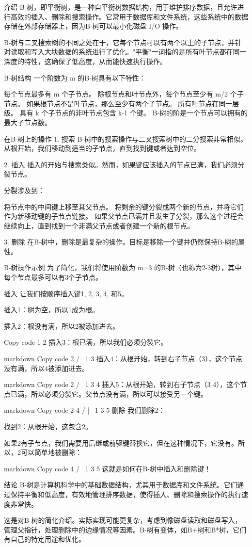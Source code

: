
\begin{issues}
\issueDraft
\end{issues}

介绍
B-树，即平衡树，是一种自平衡树数据结构，用于维护排序数据，且允许进行高效的插入、删除和搜索操作。它常用于数据库和文件系统，这些系统中的数据存储在外部存储器上，因为B-树可以最小化磁盘 I/O 操作。

B-树与二叉搜索树的不同之处在于，它每个节点可以有两个以上的子节点，并针对读取和写入大块数据的系统进行了优化。"平衡"一词指的是所有叶节点都在同一深度的特性，这确保了低高度，从而能快速执行操作。

B-树结构
一个阶数为 m 的B-树具有以下特性：

每个节点最多有 m 个子节点。
除根节点和叶节点外，每个节点至少有 m/2 个子节点。
如果根节点不是叶节点，那么至少有两个子节点。
所有叶节点在同一层级。
具有 k 个子节点的非叶节点包含 k-1 个键。
B-树的阶是一个节点可以拥有的最大子节点数。

在B-树上的操作
1. 搜索
B-树中的搜索操作与二叉搜索树中的二分搜索非常相似。从根开始，我们移动到适当的子节点，直到找到键或者达到空位。

2. 插入
插入的开始与搜索类似。然而，如果键应该插入的节点已满，我们必须分裂节点。

分裂涉及到：

将节点中的中间键上移至其父节点。
将剩余的键分裂成两个新的节点，并将它们作为新移动键的子节点链接。
如果父节点已满并且发生了分裂，那么这个过程会继续向上，直到找到一个非满父节点或者创建一个新的根节点。

3. 删除
在B-树中，删除是最复杂的操作。目标是移除一个键并仍然保持B-树的属性。

B-树操作示例
为了简化，我们将使用阶数为 m=3 的B-树（也称为2-3树），其中每个节点最多可以有3个子节点。

插入
让我们按顺序插入键1, 2, 3, 4, 和5。

插入1：树为空，所以1成为根。

插入2：根没有满，所以2被添加进去。

Copy code
 1 2
插入3：根已满，所以我们必须分裂它。

markdown
Copy code
     2
   /   \
 1       3
插入4：从根开始，转到右子节点（3），这个节点没有满，所以4被添加进去。

markdown
Copy code
     2
   /   \
 1      3 4
插入5：从根开始，转到右子节点（3 4），这个节点已满，所以必须分裂它。父节点没有满，所以可以接受另一个键。

markdown
Copy code
     2 4
   /   |   \
 1      3    5
删除
我们删除2：

找到2：从根开始，这包含2。

如果2有子节点，我们需要用后继或前驱键替换它，但在这种情况下，它没有。所以，2可以简单地被删除：

markdown
Copy code
     4
   /   \
 1      3 5
这就是如何在B-树中插入和删除键！

结论
B-树是计算机科学中的基础数据结构，尤其用于数据库和文件系统。它们通过保持平衡和低高度，有效地管理排序数据，使得插入、删除和搜索操作的执行速度非常快。

这是对B-树的简化介绍。实际实现可能更复杂，考虑到像磁盘读取和磁盘写入，管理父指针，处理删除中的边缘情况等因素。B-树有变体，如B+树和B*树，它们有自己的特定用途和优化。